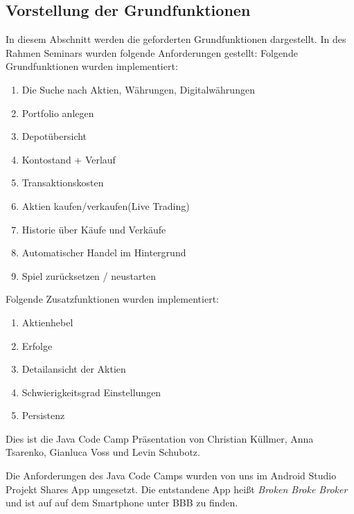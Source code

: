 \documentclass[10pt]{scrartcl}
\begin{document}
\subsection{Vorstellung der Grundfunktionen}
In diesem Abschnitt werden die geforderten Grundfunktionen dargestellt. In des Rahmen Seminars wurden folgende Anforderungen gestellt:
\newline
Folgende Grundfunktionen wurden implementiert:
\begin{enumerate}
	\item Die Suche nach Aktien, Währungen, Digitalwährungen
	\item Portfolio anlegen
	\item Depotübersicht
	\item Kontostand + Verlauf
	\item Transaktionskosten
	\item Aktien kaufen/verkaufen(Live Trading)
	\item Historie über Käufe und Verkäufe
	\item Automatischer Handel im Hintergrund
	\item Spiel zurücksetzen / neustarten
\end{enumerate}

Folgende Zusatzfunktionen wurden implementiert:

\begin{enumerate}
	\item Aktienhebel
	\item Erfolge
	\item Detailansicht der Aktien
	\item Schwierigkeitsgrad Einstellungen
	\item Persistenz
\end{enumerate}

Dies ist die Java Code Camp Präsentation von Christian Küllmer, Anna Tsarenko, Gianluca Voss und Levin Schubotz.

Die Anforderungen des Java Code Camps wurden von uns im Android Studio Projekt Shares App umgesetzt. Die entstandene App heißt \textit{Broken Broke Broker} und ist auf auf dem Smartphone unter BBB zu finden.
\end{document}
